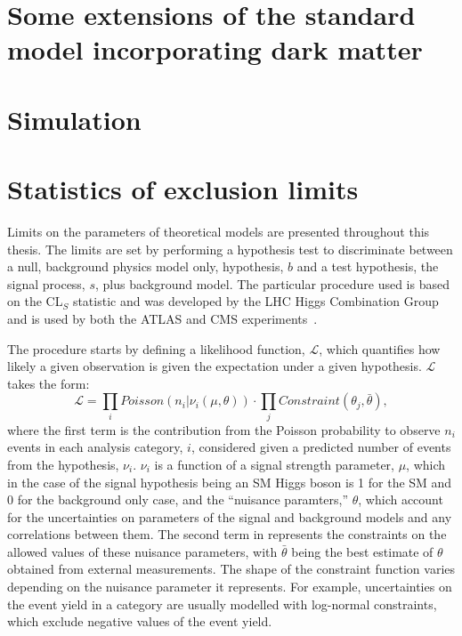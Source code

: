 \section{Some extensions of the standard model incorporating dark matter}
\label{sec:DMextensions}

\section{Simulation}

\section{Statistics of exclusion limits}
\label{sec:stats}
Limits on the parameters of theoretical models are presented throughout this thesis. The limits are set by performing a hypothesis test to discriminate between a null, background physics model only, hypothesis, $b$ and a test hypothesis, the signal process, $s$, plus background model. The particular procedure used is based on the CL$_{S}$ statistic and was developed by the LHC Higgs Combination Group and is used by both the ATLAS and CMS experiments~\cite{ATL-PHYS-PUB-2011-011}. 

The procedure starts by defining a likelihood function, $\mathcal{L}$, which quantifies how likely a given observation is given the expectation under a given hypothesis. $\mathcal{L}$ takes the form:
\begin{equation}
  \label{eq:likelihood}
  \mathcal{L}=\displaystyle\prod_{i}Poisson\left(n_{i}|\nu_{i}\left(\mu,\theta\right)\right)\cdot\prod_{j}Constraint\left(\theta_{j},\bar{\theta}\right),
\end{equation}
where the first term is the contribution from the Poisson probability to observe $n_{i}$ events in each analysis category, $i$, considered given a predicted number of events from the hypothesis, $\nu_{i}$. $\nu_{i}$ is a function of a signal strength parameter, $\mu$, which in the case of the signal hypothesis being an SM Higgs boson is 1 for the SM and 0 for the background only case, and the ``nuisance paramters,'' $\theta$, which account for the uncertainties on parameters of the signal and background models and any correlations between them. The second term in  represents the constraints on the allowed values of these nuisance parameters, with $\bar{\theta}$ being the best estimate of $\theta$ obtained from external measurements. The shape of the constraint function varies depending on the nuisance parameter it represents. For example, uncertainties on the event yield in a category are usually modelled with log-normal constraints, which exclude negative values of the event yield.

